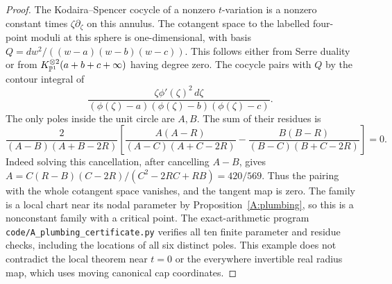 \begin{proof}
The Kodaira--Spencer cocycle of a nonzero $t$-variation is a
nonzero constant times $\zeta\partial_\zeta$ on this annulus.
The cotangent space to the labelled four-point moduli at this
sphere is one-dimensional, with basis
$Q=dw^2/((w-a)(w-b)(w-c))$. This follows either from Serre
duality or from $K_{{\mathbb{P}}^1}^{\otimes2}(a+b+c+\infty)$ having
degree zero. The cocycle pairs with $Q$ by the contour integral
of
\[
 \frac{\zeta\phi'(\zeta)^2\,d\zeta}
      {(\phi(\zeta)-a)(\phi(\zeta)-b)(\phi(\zeta)-c)}.
\]
The only poles inside the unit circle are $A,B$. The sum of
their residues is
\[
 \frac{2}{(A-B)(A+B-2R)}
 \left[
 \frac{A(A-R)}{(A-C)(A+C-2R)}
 -
 \frac{B(B-R)}{(B-C)(B+C-2R)}
 \right]=0.
\]
Indeed solving this cancellation, after cancelling $A-B$,
gives $A=C(R-B)(C-2R)/(C^2-2RC+RB)=420/569$.
Thus the pairing with the whole cotangent space vanishes,
and the tangent map is zero. The family is a local chart
near its nodal parameter by Proposition~\ref{A:plumbing},
so this is a nonconstant family with a critical point.
The exact-arithmetic program
\texttt{code/A\_plumbing\_certificate.py} verifies all ten
finite parameter and residue checks, including the locations
of all six distinct poles. This example does not contradict
the local theorem near $t=0$ or the everywhere invertible
real radius map, which uses moving canonical cap coordinates.

\end{proof}
